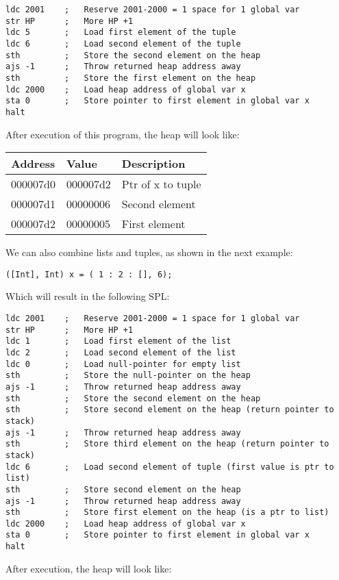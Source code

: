 \documentclass[a4paper]{article}
\begin{document}
\begin{lstlisting}
ldc 2001	;	Reserve 2001-2000 = 1 space for 1 global var
str HP		;	More HP +1
ldc 5		;	Load first element of the tuple
ldc 6		;	Load second element of the tuple
sth			;	Store the second element on the heap
ajs -1		;	Throw returned heap address away
sth			;	Store the first element on the heap
ldc 2000	;	Load heap address of global var x
sta 0		;	Store pointer to first element in global var x
halt
\end{lstlisting}
After execution of this program, the heap will look like:

\begin{tabular}{|l|l|l|}
	\hline
	Address & Value & Description \\
	\hline
	000007d0 & 000007d2 & Ptr of x to tuple \\
	000007d1 & 00000006 & Second element  \\
	000007d2 & 00000005 & First element  \\
	\hline
\end{tabular}

We can also combine lists and tuples, as shown in the next example: 
\begin{lstlisting}
([Int], Int) x = ( 1 : 2 : [], 6);
\end{lstlisting}

Which will result in the following SPL:
\begin{lstlisting}
ldc 2001	;	Reserve 2001-2000 = 1 space for 1 global var
str HP		;	More HP +1
ldc 1		;	Load first element of the list
ldc 2		;	Load second element of the list
ldc 0		;	Load null-pointer for empty list
sth			;	Store the null-pointer on the heap
ajs -1		;	Throw returned heap address away
sth			;	Store the second element on the heap
sth			;	Store second element on the heap (return pointer to stack)
ajs -1		;	Throw returned heap address away
sth			;	Store third element on the heap (return pointer to stack)
ldc 6		;	Load second element of tuple (first value is ptr to list)
sth			;	Store second element on the heap
ajs -1		;	Throw returned heap address away
sth			;	Store first element on the heap (is a ptr to list)
ldc 2000	;	Load heap address of global var x
sta 0		;	Store pointer to first element in global var x
halt
\end{lstlisting}

After execution, the heap will look like:
\end{document}
